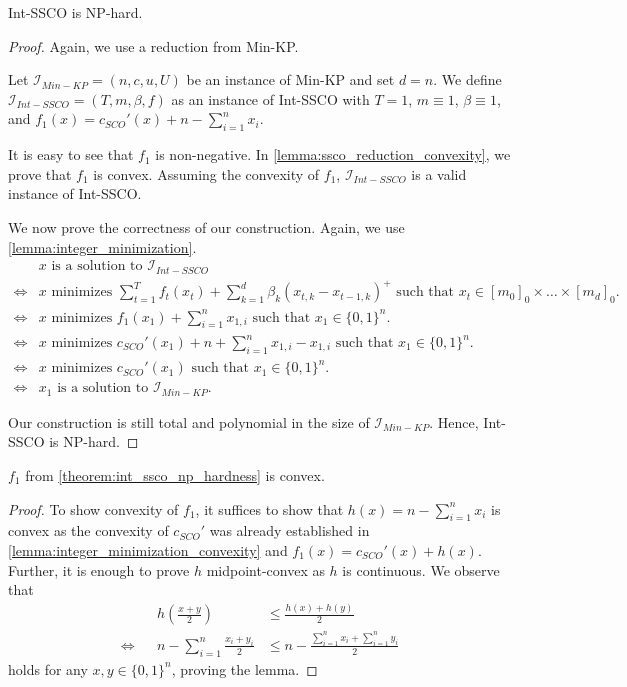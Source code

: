 \begin{theorem}
\label{theorem:int_ssco_np_hardness}
Int-SSCO is NP-hard.
\end{theorem}
\begin{proof}
Again, we use a reduction from Min-KP.

Let $\mathcal{I}_{Min-KP} = (n, c, u, U)$ be an instance of Min-KP and set $d = n$. We define $\mathcal{I}_{Int-SSCO} = (T, m, \beta, f)$ as an instance of Int-SSCO with $T = 1$, $m \equiv 1$, $\beta \equiv 1$, and $f_1(x) = c_{SCO}'(x) + n - \sum_{i=1}^n x_i$.

It is easy to see that $f_1$ is non-negative. In \autoref{lemma:ssco_reduction_convexity}, we prove that $f_1$ is convex. Assuming the convexity of $f_1$, $\mathcal{I}_{Int-SSCO}$ is a valid instance of Int-SSCO.

We now prove the correctness of our construction. Again, we use \autoref{lemma:integer_minimization}. \begin{align*}
         &x \text{ is a solution to } \mathcal{I}_{Int-SSCO} \\
    \iff &x \text{ minimizes } \sum_{t=1}^T f_t(x_t) + \sum_{k=1}^d \beta_k (x_{t,k} - x_{t-1,k})^+ \text{ such that } x_t \in [m_0]_0 \times \dots \times [m_d]_0. \\
    \iff &x \text{ minimizes } f_1(x_1) + \sum_{i=1}^n x_{1,i} \text{ such that } x_1 \in \{0,1\}^n. \\
    \iff &x \text{ minimizes } c_{SCO}'(x_1) + n + \sum_{i=1}^n x_{1,i} - x_{1,i} \text{ such that } x_1 \in \{0,1\}^n. \\
    \iff &x \text{ minimizes } c_{SCO}'(x_1) \text{ such that } x_1 \in \{0,1\}^n. \\
    \iff &x_1 \text{ is a solution to } \mathcal{I}_{Min-KP}.
\end{align*}

Our construction is still total and polynomial in the size of $\mathcal{I}_{Min-KP}$. Hence, Int-SSCO is NP-hard.
\end{proof}

\begin{lemma}
\label{lemma:ssco_reduction_convexity}
$f_1$ from \autoref{theorem:int_ssco_np_hardness} is convex.
\end{lemma}
\begin{proof}
To show convexity of $f_1$, it suffices to show that $h(x) = n - \sum_{i=1}^n x_i$ is convex as the convexity of $c_{SCO}'$ was already established in \autoref{lemma:integer_minimization_convexity} and $f_1(x) = c_{SCO}'(x) + h(x)$. Further, it is enough to prove $h$ midpoint-convex as $h$ is continuous. We observe that \begin{align*}
         &&h(\frac{x + y}{2}) &\leq \frac{h(x) + h(y)}{2} \\
    \iff &&n - \sum_{i=1}^n \frac{x_i + y_i}{2} &\leq n - \frac{\sum_{i=1}^n x_i + \sum_{i=1}^n y_i}{2}
\end{align*} holds for any $x, y \in \{0,1\}^n$, proving the lemma.
\end{proof}

